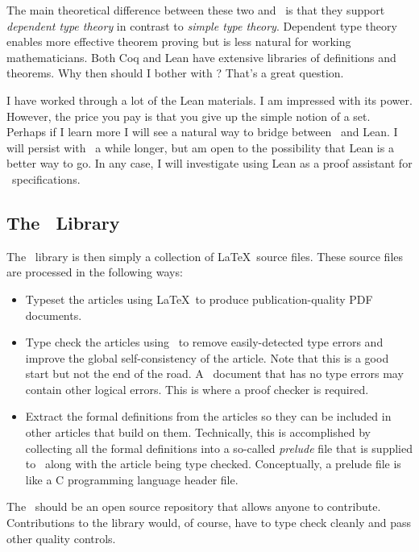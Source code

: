 \documentclass{amsart}
\begin{document}
The main theoretical difference between these two and \ZN\ is that they support \emph{dependent type theory}
in contrast to \emph{simple type theory}.
Dependent type theory enables more effective theorem proving but is less natural for working mathematicians.
Both Coq and Lean have extensive libraries of definitions and theorems.
Why then should I bother with \ZN?
That's a great question.

I have worked through a lot of the Lean materials.
I am impressed with its power.
However, the price you pay is that you give up the simple notion of a set.
Perhaps if I learn more I will see a natural way to bridge between \ZN\ and Lean.
I will persist with \ZN\ a while longer, but am open to the possibility that Lean is a better way to go.
In any case, I will investigate using Lean as a proof assistant for \ZN\ specifications.

\subsection{The \mathz\ Library}

The \mathz\ library is then simply a collection of \LaTeX\ source files.
These source files are processed in the following ways:
\begin{itemize}
\item Typeset the articles using \LaTeX\ to produce publication-quality PDF documents.
\item Type check the articles using \fuzz\ to remove easily-detected type errors and improve the global self-consistency of the article.
Note that this is a good start but not the end of the road. 
A \ZN\ document that has no type errors may contain other logical errors.
This is where a proof checker is required.
\item Extract the formal definitions from the articles so they can be included in other articles that build on them.
Technically, this is accomplished by collecting all the formal definitions into a so-called \emph{prelude} file that
is supplied to \fuzz\ along with the article being type checked.
Conceptually, a prelude file is like a C programming language header file.
\end{itemize}

The \mathz\ should be an open source repository that allows anyone to contribute.
Contributions to the library would, of course, have to type check cleanly and pass other quality controls.

\hypertarget{seamless-interoperability-with-latex}{}
\end{document}
